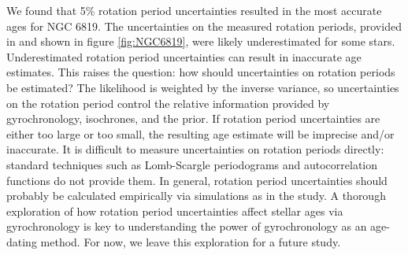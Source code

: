 We found that 5\% rotation period uncertainties resulted in the most accurate
ages for NGC 6819.
The uncertainties on the measured rotation periods, provided in
\citet{meibom2015} and shown in figure \ref{fig:NGC6819}, were likely
underestimated for some stars.
Underestimated rotation period uncertainties can result in inaccurate age
estimates.
This raises the question: how should uncertainties on rotation periods be
estimated?
The likelihood is weighted by the inverse variance, so uncertainties on the
rotation period control the relative information provided by gyrochronology,
isochrones, and the prior.
If rotation period uncertainties are either too large or too small, the
resulting age estimate will be imprecise and/or inaccurate.
It is difficult to measure uncertainties on rotation periods directly:
standard techniques such as Lomb-Scargle periodograms and autocorrelation
functions do not provide them.
In general, rotation period uncertainties should probably be calculated
empirically via simulations as in the \citet{aigrain2015} study.
A thorough exploration of how rotation period uncertainties affect stellar
ages via gyrochronology is key to understanding the power of gyrochronology as
an age-dating method.
For now, we leave this exploration for a future study.
